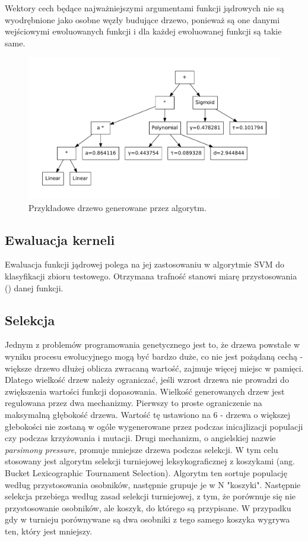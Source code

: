 \documentclass{article}
\begin{document}
Wektory cech będące najważniejszymi argumentami funkcji jądrowych nie są wyodrębnione jako osobne węzły budujące drzewo, ponieważ są one danymi wejściowymi ewoluowanych funkcji i dla każdej ewoluowanej funkcji są takie same.		

\begin{figure}[ht]
\centering
\includegraphics[scale=0.5]{figures/tree}
\caption{Przykładowe drzewo generowane przez algorytm.\label{fig:tree}}
\end{figure}


\subsection{Ewaluacja kerneli}
Ewaluacja funkcji jądrowej polega na jej zastosowaniu w algorytmie SVM do klasyfikacji zbioru testowego.
Otrzymana trafność stanowi miarę przystosowania () danej funkcji.

\subsection{Selekcja}
Jednym z problemów programowania genetycznego jest to, że drzewa powstałe w wyniku procesu ewolucyjnego mogą być bardzo duże, co nie jest pożądaną cechą - większe drzewo dłużej oblicza zwracaną wartość, zajmuje więcej miejsc w pamięci. Dlatego wielkość drzew należy ograniczać, jeśli wzrost drzewa nie prowadzi do zwiększenia wartości funkcji dopasowania.
Wielkość generowanych drzew jest regulowana przez dwa mechanizmy. Pierwszy to proste ograniczenie na maksymalną głębokość drzewa. Wartość tę ustawiono na 6 - drzewa o większej głebokości nie zostaną w ogóle wygenerowane przez podczas inicajlizacji populacji czy podczas krzyżowania i mutacji. Drugi mechanizm, o angielskiej nazwie \textit{parsimony pressure},  promuje mniejsze drzewa podczas selekcji. W tym celu stosowany jest algorytm selekcji turniejowej leksykograficznej z koszykami (ang. Bucket Lexicographic
 Tournament Selection). Algorytm ten sortuje populację według przystosowania osobników, następnie grupuje je w N "koszyki". Następnie selekcja przebiega według zasad selekcji turniejowej, z tym, że porównuje się nie przystosowanie osobników, ale koszyk, do którego są przypisane. W przypadku gdy w turnieju porównywane są dwa osobniki z tego samego koszyka wygrywa ten, który jest mniejszy.
\end{document}

